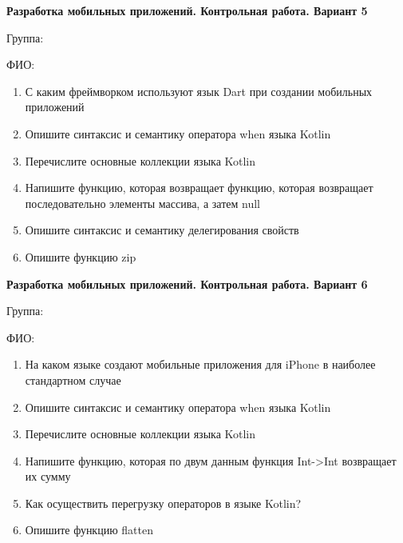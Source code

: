 \documentclass[12pt]{article}
\begin{document}
\newpage\begin{minipage}{\textwidth}
\textbf{Разработка мобильных приложений. Контрольная работа. Вариант 5}

Группа: \underline{\hspace{3cm}}

ФИО: \underline{\hspace{10cm}}

\begin{enumerate}
\item С каким фреймворком используют язык Dart при создании мобильных приложений
\item Опишите синтаксис и семантику оператора when языка Kotlin
\item Перечислите основные коллекции языка Kotlin
\item Напишите функцию, которая возвращает функцию, которая возвращает последовательно элементы массива, а затем null
\item Опишите синтаксис и семантику делегирования свойств
\item Опишите функцию zip

\end{enumerate}
\end{minipage}

\newpage\begin{minipage}{\textwidth}
\textbf{Разработка мобильных приложений. Контрольная работа. Вариант 6}

Группа: \underline{\hspace{3cm}}

ФИО: \underline{\hspace{10cm}}

\begin{enumerate}
\item На каком языке создают мобильные приложения для iPhone в наиболее стандартном случае
\item Опишите синтаксис и семантику оператора when языка Kotlin
\item Перечислите основные коллекции языка Kotlin
\item Напишите функцию, которая по двум данным функция Int->Int возвращает их сумму
\item Как осуществить перегрузку операторов в языке Kotlin?
\item Опишите функцию flatten

\end{enumerate}
\end{minipage}
\end{document}
